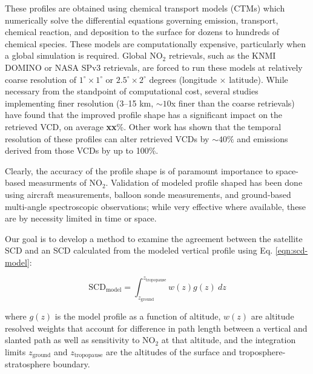 \documentclass[a4paper,10pt,oneside]{article}
\newcommand{\ce}[1]{$\mathrm{#1}$}
\begin{document}
\begin{sloppy}
These profiles are obtained using chemical transport models (CTMs) which numerically solve the differential equations governing emission, transport, chemical reaction, and deposition to the surface for dozens to hundreds of chemical species. These models are computationally expensive, particularly when a global simulation is required. Global \ce{NO_2} retrievals, such as the KNMI DOMINO or NASA SPv3 retrievals, are forced to run these models at relatively coarse resolution of $1^\circ \times 1^\circ$ or $2.5^\circ \times 2^\circ$ degrees (longitude $\times$ latitude).  While necessary from the standpoint of computational cost, several studies implementing finer resolution (3--15 km, $\sim 10$x finer than the coarse retrievals) \cite{vinken14, lin15, mclinden14, russell11, kuhlmann15} have found that the improved profile shape has a significant impact on the retrieved VCD, on average \textbf{xx}\%.  Other work \cite{laughner16} has shown that the temporal resolution of these profiles can alter retrieved VCDs by $\sim 40\%$ and emissions derived from those VCDs by up to 100\%.

Clearly, the accuracy of the profile shape is of paramount importance to space-based measurments of \ce{NO_2}. Validation of modeled profile shaped has been done using aircraft measurements, balloon sonde measurements, and ground-based multi-angle spectroscopic observations; while very effective where available, these are by necessity limited in time or space. 

Our goal is to develop a method to examine the agreement between the satellite SCD and an SCD calculated from the modeled vertical profile using Eq. \eqref{eqn:scd-model}:

\begin{equation}
\mathrm{SCD_{model}} = \int_{z_{\mathrm{ground}}}^{z_{\mathrm{tropopause}}} w(z) g(z) \: dz
\label{eqn:scd-model}
\end{equation}

where $g(z)$ is the model profile as a function of altitude, $w(z)$ are altitude resolved weights that account for difference in path length between a vertical and slanted path as well as sensitivity to \ce{NO_2} at that altitude, and the integration limits $z_{\mathrm{ground}}$ and $z_{\mathrm{tropopause}}$ are the altitudes of the surface and troposphere-stratosphere boundary.


\end{sloppy}
\end{document}
